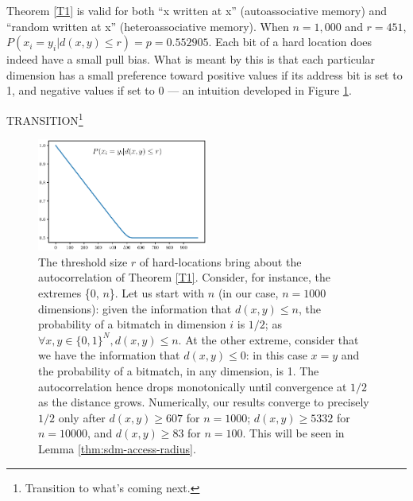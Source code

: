 Theorem \ref{T1} is valid for both ``x written at x'' (autoassociative memory) and ``random written at x'' (heteroassociative memory). When $n=1,000$ and $r=451$, $P(x_i = y_i | d(x, y) \le r) = p = 0.552905$.  Each bit of a hard location does indeed have a small pull bias.  What is meant by this is that each particular dimension has a small preference toward positive values if its address bit is set to 1, and negative values if set to 0 --- an intuition developed in Figure \ref{fig:bitmatchbias}.

TRANSITION\footnote{Transition to what's coming next.}

\begin{figure}[!ht]
\centering

\includegraphics[width=0.5\textwidth]{./images02/autocorrelation/autocorrelation_n=1000_closeview=False.eps}

\caption{The threshold size $r$ of hard-locations bring about the autocorrelation of Theorem \ref{T1}. Consider, for instance, the extremes \{0, $n$\}.  Let us start with $n$ (in our case, $n=1000$ dimensions): given the information that $d(x,y)\le n$, the probability of a bitmatch in dimension $i$ is $1/2$; as $\forall x,y \in \{0, 1\}^N, d(x,y)\le n$. At the other extreme, consider that we have the information that $d(x,y)\le 0$: in this case $x=y$ and the probability of a bitmatch, in any dimension, is 1. The autocorrelation hence drops monotonically until convergence at $1/2$ as the distance grows. Numerically, our results converge to precisely $1/2$ only after $d(x,y)\ge 607$ for $n=1000$; $d(x,y)\ge 5332$ for $n=10000$, and $d(x,y)\ge 83$ for $n=100$. This will be seen in Lemma \ref{thm:sdm-access-radius}.
\label{fig:bitmatchbias}}
\end{figure}



